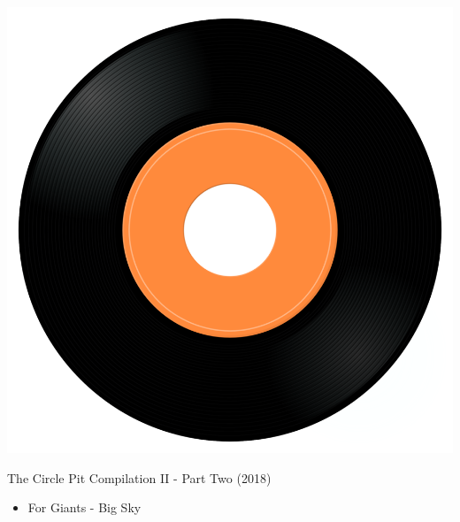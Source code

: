 \begin{minipage}[t]{0.25\textwidth}\vspace{0pt}
\captionsetup{type=figure}
\includegraphics[width=\textwidth]{Images/cover.png}
\caption*{The Circle Pit Compilation II - Part Two (2018)}
\end{minipage}
\begin{minipage}[t]{0.25\textwidth}\vspace{0pt}
\begin{itemize}[nosep,leftmargin=1em,labelwidth=*,align=left]
	\setlength{\itemsep}{0pt}
	\item For Giants - Big Sky
\end{itemize}
\end{minipage}
